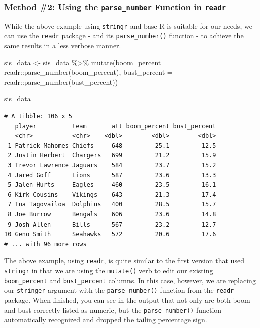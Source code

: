 \documentclass[
  letterpaper,
]{krantz}
\newenvironment{Shaded}{\begin{snugshade}}{\end{snugshade}}
\newcommand{\AttributeTok}[1]{\textcolor[rgb]{0.40,0.45,0.13}{#1}}
\newcommand{\FunctionTok}[1]{\textcolor[rgb]{0.28,0.35,0.67}{#1}}
\newcommand{\NormalTok}[1]{\textcolor[rgb]{0.00,0.23,0.31}{#1}}
\newcommand{\OtherTok}[1]{\textcolor[rgb]{0.00,0.23,0.31}{#1}}
\newcommand{\SpecialCharTok}[1]{\textcolor[rgb]{0.37,0.37,0.37}{#1}}
\begin{document}
\hypertarget{method-2-using-the-parse_number-function-in-readr}{%
\subsubsection{\texorpdfstring{Method \#2: Using the
\texttt{parse\_number} Function in
\texttt{readr}}{Method \#2: Using the parse\_number Function in readr}}\label{method-2-using-the-parse_number-function-in-readr}}

While the above example using \texttt{stringr} and base R is suitable
for our needs, we can use the \texttt{readr} package - and its
\texttt{parse\_number()} function - to achieve the same results in a
less verbose manner.

\begin{Shaded}
\begin{Highlighting}[]
\NormalTok{sis\_data }\OtherTok{\textless{}{-}}\NormalTok{ sis\_data }\SpecialCharTok{\%\textgreater{}\%}
  \FunctionTok{mutate}\NormalTok{(}\AttributeTok{boom\_percent =}\NormalTok{ readr}\SpecialCharTok{::}\FunctionTok{parse\_number}\NormalTok{(boom\_percent),}
         \AttributeTok{bust\_percent =}\NormalTok{ readr}\SpecialCharTok{::}\FunctionTok{parse\_number}\NormalTok{(bust\_percent))}

\NormalTok{sis\_data}
\end{Highlighting}
\end{Shaded}

\begin{verbatim}
# A tibble: 106 x 5
   player          team       att boom_percent bust_percent
   <chr>           <chr>    <dbl>        <dbl>        <dbl>
 1 Patrick Mahomes Chiefs     648         25.1         12.5
 2 Justin Herbert  Chargers   699         21.2         15.9
 3 Trevor Lawrence Jaguars    584         23.7         15.2
 4 Jared Goff      Lions      587         23.6         13.3
 5 Jalen Hurts     Eagles     460         23.5         16.1
 6 Kirk Cousins    Vikings    643         21.3         17.4
 7 Tua Tagovailoa  Dolphins   400         28.5         15.7
 8 Joe Burrow      Bengals    606         23.6         14.8
 9 Josh Allen      Bills      567         23.2         12.7
10 Geno Smith      Seahawks   572         20.6         17.6
# ... with 96 more rows
\end{verbatim}

The above example, using \texttt{readr}, is quite similar to the first
version that used \texttt{stringr} in that we are using the
\texttt{mutate()} verb to edit our existing \texttt{boom\_percent} and
\texttt{bust\_percent} columns. In this case, however, we are replacing
our \texttt{stringer} argument with the \texttt{parse\_number()}
function from the \texttt{readr} package. When finished, you can see in
the output that not only are both boom and bust correctly listed as
numeric, but the \texttt{parse\_number()} function automatically
recognized and dropped the tailing percentage sign.
\end{document}
